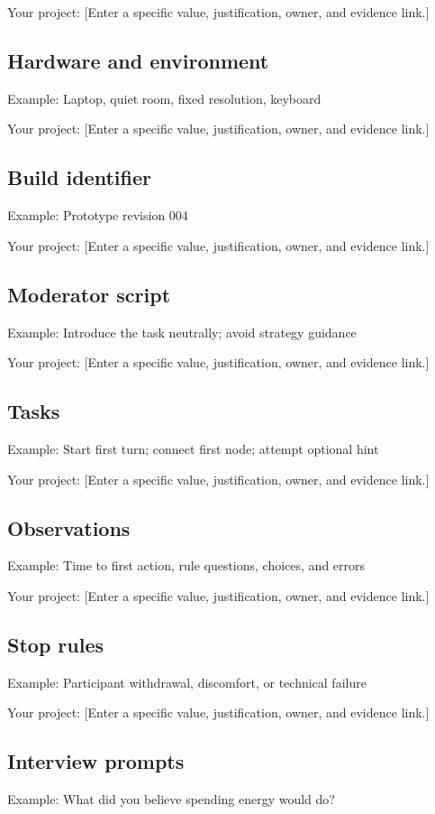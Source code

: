 \documentclass[11pt]{article}
\begin{document}
Your project: [Enter a specific value, justification, owner, and evidence link.]


\subsection{Hardware and environment}
Example: Laptop, quiet room, fixed resolution, keyboard

Your project: [Enter a specific value, justification, owner, and evidence link.]


\subsection{Build identifier}
Example: Prototype revision 004

Your project: [Enter a specific value, justification, owner, and evidence link.]


\subsection{Moderator script}
Example: Introduce the task neutrally; avoid strategy guidance

Your project: [Enter a specific value, justification, owner, and evidence link.]


\subsection{Tasks}
Example: Start first turn; connect first node; attempt optional hint

Your project: [Enter a specific value, justification, owner, and evidence link.]


\subsection{Observations}
Example: Time to first action, rule questions, choices, and errors

Your project: [Enter a specific value, justification, owner, and evidence link.]


\subsection{Stop rules}
Example: Participant withdrawal, discomfort, or technical failure

Your project: [Enter a specific value, justification, owner, and evidence link.]


\subsection{Interview prompts}
Example: What did you believe spending energy would do?
\end{document}
